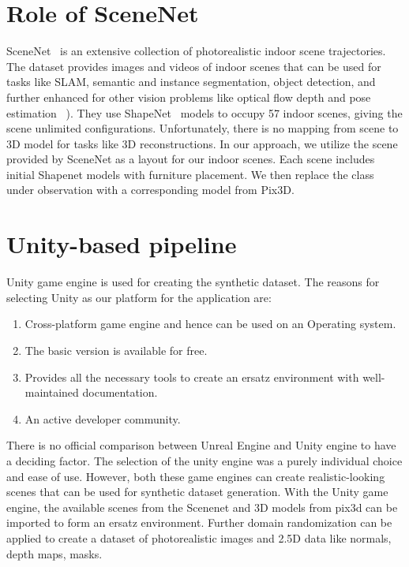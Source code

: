\section{Role of SceneNet}\label{sec:role-of-scenenet}
SceneNet~\cite{McCormac:etal:ICCV2017} is an extensive collection of photorealistic indoor scene trajectories.
The dataset provides images and videos of indoor scenes that can be used for tasks like SLAM,
semantic and instance segmentation, object detection, and further enhanced for other vision problems like optical flow depth and pose estimation ~\cite{McCormac:etal:ICCV2017}).
They use ShapeNet~\cite{chang2015shapenet} models to occupy 57 indoor scenes, giving the scene unlimited configurations.
Unfortunately, there is no mapping from scene to 3D model for tasks like 3D reconstructions.
In our approach, we utilize the scene provided by SceneNet as a layout for our indoor scenes.
Each scene includes initial Shapenet models with furniture placement.
We then replace the class under observation with a corresponding model from Pix3D.

\section{Unity-based pipeline}\label{sec:unity-based-pipeline}
Unity game engine is used for creating the synthetic dataset.
The reasons for selecting Unity as our platform for the application are:
\begin{enumerate}
    \item Cross-platform game engine and hence can be used on an Operating system.
    \item The basic version is available for free.
    \item Provides all the necessary tools to create an ersatz environment with well-maintained documentation.
    \item An active developer community.
\end{enumerate}

There is no official comparison between Unreal Engine and Unity engine to have a deciding factor.
The selection of the unity engine was a purely individual choice and ease of use.
However, both these game engines can create realistic-looking scenes that can be used for synthetic dataset generation.
With the Unity game engine, the available scenes from the Scenenet and 3D models from pix3d can be imported to form an ersatz environment.
Further domain randomization can be applied to create a dataset of photorealistic images and 2.5D data like normals, depth maps, masks.

